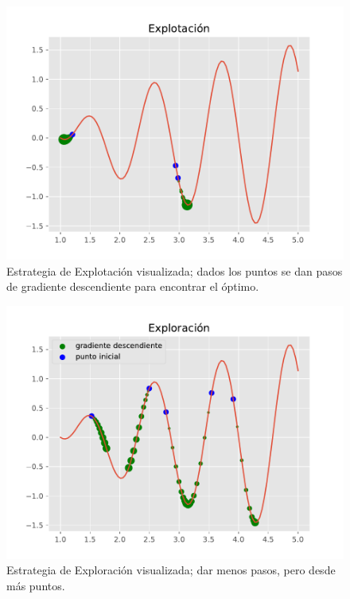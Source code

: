 \begin{figure}[H]
    \centering
    \includegraphics[width=\textwidth]{Figuras/explotacion.pdf}
    \caption[Explotación]{Estrategia de Explotación visualizada; dados los puntos se dan pasos de gradiente descendiente para encontrar el óptimo.}
    \label{fig:explotacion}
\end{figure}

\begin{figure}[H]
    \centering
    \includegraphics[width=\textwidth]{Figuras/exploracion.pdf}
    \caption[Exploración]{Estrategia de Exploración visualizada; dar menos pasos, pero desde más puntos.}
    \label{fig:exploracion}
\end{figure}

